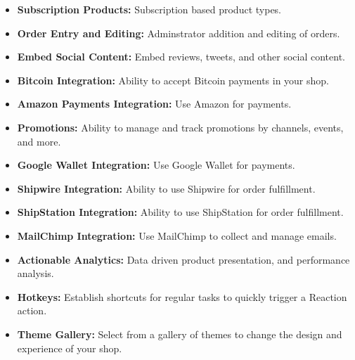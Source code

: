 \begin{itemize}
	\item \textbf{ Subscription Products:} Subscription based product types.
	
	\item \textbf{ Order Entry and Editing:} Adminstrator addition and editing of orders.
	
	\item \textbf{ Embed Social Content:} Embed reviews, tweets, and other social content.
	
	\item \textbf{ Bitcoin Integration:} Ability to accept Bitcoin payments in your shop.
	
	\item \textbf{ Amazon Payments Integration:} Use Amazon for payments.
	
	\item \textbf{ Promotions:} Ability to manage and track promotions by channels, events, and more.
	
	\item \textbf{ Google Wallet Integration:} Use Google Wallet for payments.
	
	\item \textbf{ Shipwire Integration:} Ability to use Shipwire for order fulfillment.
	
	\item \textbf{ ShipStation Integration:} Ability to use ShipStation for order fulfillment.
	
	\item \textbf{ MailChimp Integration:} Use MailChimp to collect and manage emails.
	
	\item \textbf{ Actionable Analytics:} Data driven product presentation, and performance analysis.
	
	\item \textbf{ Hotkeys:} Establish shortcuts for regular tasks to quickly trigger a Reaction action.
	
	\item \textbf{ Theme Gallery:} Select from a gallery of themes to change the design and experience of your shop.
	
%	
%	
%	
%	
	
\end{itemize}


